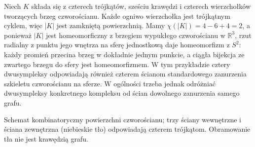 \begin{przyklad}
Niech $K$ składa się z czterech trójkątów, sześciu krawędzi
i czterech wierzchołków tworzących brzeg czworościanu.
Każde ogniwo wierzchołka jest trójkątnym cyklem, więc
$|K|$ jest zamkniętą powierzchnią. Mamy
$\chi(|K|)=4-6+4=2$, a ponieważ $|K|$ jest homeomorficzny z brzegiem
wypukłego czworościanu w $\mathbb R^3$, rzut radialny
z punktu jego wnętrza na sferę jednostkową daje
homeomorfizm z $S^2$: każdy promień przecina brzeg
w dokładnie jednym punkcie, a ciągła bijekcja
ze zwartego brzegu do sfery jest homeomorfizmem.
W tym przykładzie cztery dwusympleksy odpowiadają również
czterem ścianom standardowego zanurzenia szkieletu
czworościanu na sferze. W ogólności trzeba jednak odróżniać
dwusympleksy konkretnego kompleksu od ścian dowolnego
zanurzenia samego grafu.
\end{przyklad}

\begin{samepage}
\begin{center}
\begin{minipage}{.96\linewidth}\centering
{}\par\smallskip

{\footnotesize Schemat kombinatoryczny powierzchni czworościanu;
trzy ściany wewnętrzne i ściana zewnętrzna (niebieskie tło)
odpowiadają czterem trójkątom. Obramowanie tła nie jest krawędzią grafu.}
\end{minipage}
\end{center}
\end{samepage}

